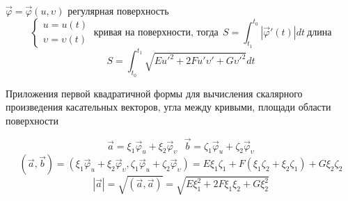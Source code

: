 \begin{block}
  $\vec \varphi = \vec \varphi(u, \upsilon)$ регулярная поверхность
  $$
  \left\{
    \begin{array}{l}
      u = u(t) \\
      \upsilon = \upsilon(t)
    \end{array}
  \right. ~ \text{кривая на поверхности, тогда} ~~
  S = \int_{t_1}^{t_0} |\vec \varphi'(t)| dt ~ \text{длина}
  $$
  $$
  S = \int_{t_0}^{t_1} \sqrt{E u'^2 + 2Fu'\upsilon' + G\upsilon'^2}dt
  $$
\end{block}

\begin{title}[\Large]
  Приложения первой квадратичной формы для вычисления скалярного произведения
  касательных векторов, угла между кривыми, площади области поверхности
\end{title}

\begin{block}
  $$
  \vec a = \xi_1 \vec \varphi_u + \xi_2 \vec \varphi_{\upsilon} ~~~
  \vec b = \zeta_1 \vec \varphi_u + \zeta_2 \vec \varphi_{\upsilon}
  $$
  $$
  (\vec a, \vec b) = (\xi_1 \vec \varphi_u + \xi_2 \vec \varphi_{\upsilon},
  \zeta_1 \vec \varphi_u + \zeta_2 \vec \varphi_{\upsilon}) =
  E \xi_1 \zeta_1 + F(\xi_1 \zeta_2 + \xi_2 \zeta_1) + G\xi_2 \zeta_2
  $$
  $$
  |\vec a| = \sqrt{(\vec a, \vec a)} = \sqrt{E\xi_1^2 + 2F\xi_1 \xi_2 +
  G\xi_2^2}
  $$
\end{block}

